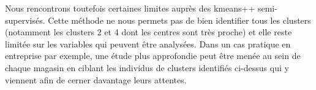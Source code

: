 \documentclass[12pt,a4paper]{book}
\newcommand{\1}{\mathds{1}}
\begin{document}
Nous rencontrons toutefois certaines limites auprès des kmeans++ semi-supervisés. Cette méthode ne nous permets pas de bien identifier tous les clusters (notamment les clusters 2 et 4 dont les centres sont très proche) et elle reste limitée sur les variables qui peuvent être analysées. Dans un cas pratique en entreprise par exemple, une étude plus approfondie  peut être menée au sein de chaque magasin en ciblant les individus de clusters identifiés ci-dessus qui y viennent afin de cerner davantage leurs attentes.







\vspace{10 mm}




\nocite{XIN2011}
\nocite{OUM2016}
\nocite{FAB2018}

\renewcommand\bibname{Références}


\end{document}
